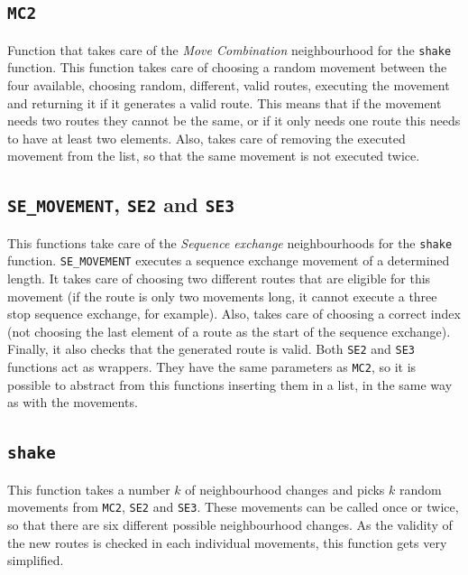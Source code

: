 \documentclass[11pt]{article}
\begin{document}
\subsection{\texttt{MC2}}

Function that takes care of the \textit{Move Combination} neighbourhood for the \texttt{shake} function. This function takes care of choosing a random movement between the four available, choosing random, different, valid routes, executing the movement and returning it if it generates a valid route. This means that if the movement needs two routes they cannot be the same, or if it only needs one route this needs to have at least two elements. Also, takes care of removing the executed movement from the list, so that the same movement is not executed twice. 

\subsection{\texttt{SE\_MOVEMENT}, \texttt{SE2} and \texttt{SE3}}

This functions take care of the \textit{Sequence exchange} neighbourhoods for the \texttt{shake} function. \texttt{SE\_MOVEMENT} executes a sequence exchange movement of a determined length. It takes care of choosing two different routes that are eligible for this movement (if the route is only two movements long, it cannot execute a three stop sequence exchange, for example). Also, takes care of choosing a correct index (not choosing the last element of a route as the start of the sequence exchange). Finally, it also checks that the generated route is valid. Both \texttt{SE2} and \texttt{SE3} functions act as wrappers. They have the same parameters as \texttt{MC2}, so it is possible to abstract from this functions inserting them in a list, in the same way as with the movements. 

\subsection{\texttt{shake}}

This function takes a number $k$ of neighbourhood changes and picks $k$ random movements from \texttt{MC2}, \texttt{SE2} and \texttt{SE3}. These movements can be called once or twice, so that there are six different possible neighbourhood changes. As the validity of the new routes is checked in each individual movements, this function gets very simplified. \\
\end{document}
